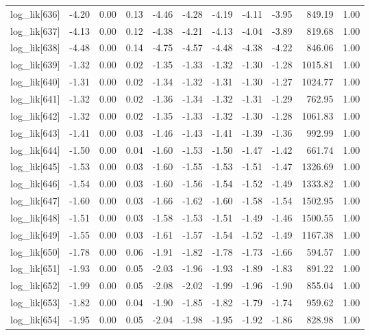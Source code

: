 \begin{table}[ht]
\begin{tabular}{rrrrrrrrrrr}
  log\_lik[636] & -4.20 & 0.00 & 0.13 & -4.46 & -4.28 & -4.19 & -4.11 & -3.95 & 849.19 & 1.00 \\ 
  log\_lik[637] & -4.13 & 0.00 & 0.12 & -4.38 & -4.21 & -4.13 & -4.04 & -3.89 & 819.68 & 1.00 \\ 
  log\_lik[638] & -4.48 & 0.00 & 0.14 & -4.75 & -4.57 & -4.48 & -4.38 & -4.22 & 846.06 & 1.00 \\ 
  log\_lik[639] & -1.32 & 0.00 & 0.02 & -1.35 & -1.33 & -1.32 & -1.30 & -1.28 & 1015.81 & 1.00 \\ 
  log\_lik[640] & -1.31 & 0.00 & 0.02 & -1.34 & -1.32 & -1.31 & -1.30 & -1.27 & 1024.77 & 1.00 \\ 
  log\_lik[641] & -1.32 & 0.00 & 0.02 & -1.36 & -1.34 & -1.32 & -1.31 & -1.29 & 762.95 & 1.00 \\ 
  log\_lik[642] & -1.32 & 0.00 & 0.02 & -1.35 & -1.33 & -1.32 & -1.30 & -1.28 & 1061.83 & 1.00 \\ 
  log\_lik[643] & -1.41 & 0.00 & 0.03 & -1.46 & -1.43 & -1.41 & -1.39 & -1.36 & 992.99 & 1.00 \\ 
  log\_lik[644] & -1.50 & 0.00 & 0.04 & -1.60 & -1.53 & -1.50 & -1.47 & -1.42 & 661.74 & 1.00 \\ 
  log\_lik[645] & -1.53 & 0.00 & 0.03 & -1.60 & -1.55 & -1.53 & -1.51 & -1.47 & 1326.69 & 1.00 \\ 
  log\_lik[646] & -1.54 & 0.00 & 0.03 & -1.60 & -1.56 & -1.54 & -1.52 & -1.49 & 1333.82 & 1.00 \\ 
  log\_lik[647] & -1.60 & 0.00 & 0.03 & -1.66 & -1.62 & -1.60 & -1.58 & -1.54 & 1502.95 & 1.00 \\ 
  log\_lik[648] & -1.51 & 0.00 & 0.03 & -1.58 & -1.53 & -1.51 & -1.49 & -1.46 & 1500.55 & 1.00 \\ 
  log\_lik[649] & -1.55 & 0.00 & 0.03 & -1.61 & -1.57 & -1.54 & -1.52 & -1.49 & 1167.38 & 1.00 \\ 
  log\_lik[650] & -1.78 & 0.00 & 0.06 & -1.91 & -1.82 & -1.78 & -1.73 & -1.66 & 594.57 & 1.00 \\ 
  log\_lik[651] & -1.93 & 0.00 & 0.05 & -2.03 & -1.96 & -1.93 & -1.89 & -1.83 & 891.22 & 1.00 \\ 
  log\_lik[652] & -1.99 & 0.00 & 0.05 & -2.08 & -2.02 & -1.99 & -1.96 & -1.90 & 855.04 & 1.00 \\ 
  log\_lik[653] & -1.82 & 0.00 & 0.04 & -1.90 & -1.85 & -1.82 & -1.79 & -1.74 & 959.62 & 1.00 \\ 
  log\_lik[654] & -1.95 & 0.00 & 0.05 & -2.04 & -1.98 & -1.95 & -1.92 & -1.86 & 828.98 & 1.00 \\ 

\end{tabular}
\end{table}
